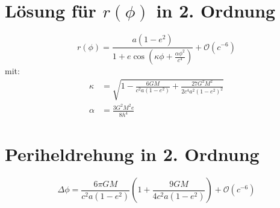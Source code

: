\section{Lösung für $r(\phi)$ in 2. Ordnung}
\begin{equation}
r(\phi) = \frac{a(1-e^2)}{1 + e \cos \left( \kappa \phi + \frac{\alpha \phi^2}{c^4} \right)} + \mathcal{O}(c^{-6})
\end{equation}
mit:
\begin{align}
\kappa &= \sqrt{1 - \frac{6GM}{c^2 a(1-e^2)} + \frac{27G^2M^2}{2c^4 a^2(1-e^2)^2}} \\
\alpha &= \frac{3G^2M^2 e}{8h^4}
\end{align}

\section{Periheldrehung in 2. Ordnung}
\begin{equation}
\Delta \phi = \frac{6\pi GM}{c^2 a(1-e^2)} \left( 1 + \frac{9GM}{4c^2 a(1-e^2)} \right) + \mathcal{O}(c^{-6})
\end{equation}
